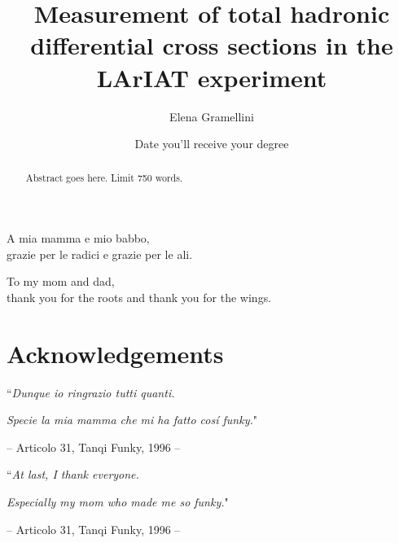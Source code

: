 \documentclass[letterpaper,12pt]{yalephd}
\newenvironment{dedication}
  {%
   \thispagestyle{empty}%
   \vspace*{\stretch{1}}%
   \itshape             %
   \raggedleft          %
  }
  {\par %
   \vspace{\stretch{3}} %
   \clearpage           %
  }
\begin{document}
\title{Measurement of total hadronic differential cross sections in the LArIAT experiment}
\author{Elena Gramellini}
\date{Date you'll receive your degree} %

\frontmatter

\begin{abstract}
Abstract goes here. Limit 750 words.
\end{abstract}


\maketitle
{}

  \begin{dedication}
A mia mamma e mio babbo,\\
grazie per le radici e grazie per le ali.
    \par   %
    \vspace{2\baselineskip}
To my mom and dad,\\
thank you for the roots and thank you for the wings.
    \vspace{\baselineskip}
  \end{dedication}

\tableofcontents

\chapter{Acknowledgements} %

{\raggedleft ``\emph{Dunque io ringrazio tutti quanti.} \par}
{\raggedleft \emph{Specie la mia mamma che mi ha fatto cos\'i funky.}"\par}
{\raggedleft -- Articolo 31, Tanqi Funky, 1996 -- \par}
\vspace{0.5cm}

{\raggedleft ``\emph{At last, I thank everyone.} \par}
{\raggedleft \emph{Especially my mom who made me so funky.}"\par}
{\raggedleft -- Articolo 31, Tanqi Funky, 1996 -- \par}
\vspace{0.5cm}
\end{document}

